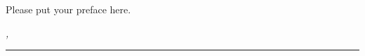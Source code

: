 %
\pagestyle{plain}

Please put your preface here.

\bigskip

\noindent\textit{\thesisUniversityCity, \thesisDate}

\smallskip

\begin{flushright}
	\begin{minipage}{5cm}
		\rule{\textwidth}{1pt}
		\centering\thesisFirstSupervisor
	\end{minipage}
\end{flushright}


